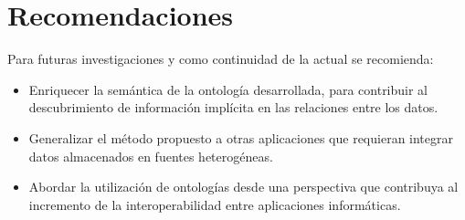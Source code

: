 \chapter*{\large Recomendaciones}

Para futuras investigaciones y como continuidad de la actual se recomienda:

\begin{itemize}
\item Enriquecer la semántica de la ontología desarrollada, para contribuir al descubrimiento de información implícita en las relaciones entre los datos.
\item Generalizar el método propuesto a otras aplicaciones que requieran integrar datos almacenados en fuentes heterogéneas.
\item Abordar la utilización de ontologías desde una perspectiva que contribuya al incremento de la interoperabilidad entre aplicaciones informáticas.
\end{itemize}